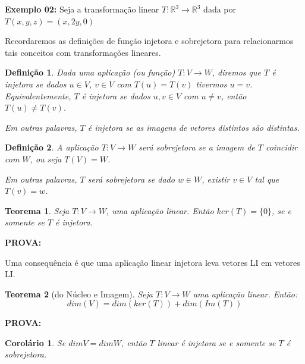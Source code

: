 \documentclass[oneside,a4paper,12pt]{article}
\newtheorem{theorem}{Teorema}[section]
\newtheorem{definition}{Definição}[section]
\newtheorem{corollary}{Corolário}[section]
\begin{document}
\vspace{200pt}

{\bf Exemplo 02:} Seja a transformação linear $T: \mathbb{R}^3 \rightarrow \mathbb{R}^3$ dada por $T(x,y,z) = (x,2y,0)$

\vspace{300pt}


Recordaremos as definições de função injetora e sobrejetora para relacionarmos tais conceitos com transformações lineares.

\begin{definition}
	Dada uma aplicação (ou função) $T: V \rightarrow W$, diremos que $T$ é \emph{injetora} se dados $u \in V$, $v \in V$ com $T(u) = T(v)$ tivermos $u = v$. Equivalentemente, $T$ é injetora se dados $u,v \in V$ com $u \neq v$, então $T(u) \neq T(v)$.
	
	Em outras palavras, $T$ é injetora se as imagens de vetores distintos são distintas.
	
	\vspace{100pt}
\end{definition}

\begin{definition}
	A aplicação $T: V \rightarrow W$ será \emph{sobrejetora} se a imagem de $T$ coincidir com $W$, ou seja $T(V) = W$.
	
	Em outras palavras, $T$ será sobrejetora se dado $w \in W$, existir $v \in V$ tal que $T(v) = w$.
	
	\vspace{100pt}
\end{definition}

\begin{theorem}
	Seja $T: V \rightarrow W$, uma aplicação linear. Então $ker(T) = \{0\}$, se e somente se $T$ é injetora.
\end{theorem}
{\bf PROVA:}
\vspace{300pt}

Uma consequência é que uma aplicação linear injetora leva vetores LI em vetores LI.

\begin{theorem}[do Núcleo e Imagem]
	Seja $T:V \rightarrow W$ uma aplicação linear. Então:
	$$dim(V) = dim(ker(T)) + dim(Im(T))$$
\end{theorem}
{\bf PROVA:}
\vspace{400pt}

\begin{corollary}
	Se $dimV = dimW$, então $T$ linear é injetora se e somente se $T$ é sobrejetora.
\end{corollary}
\end{document}
